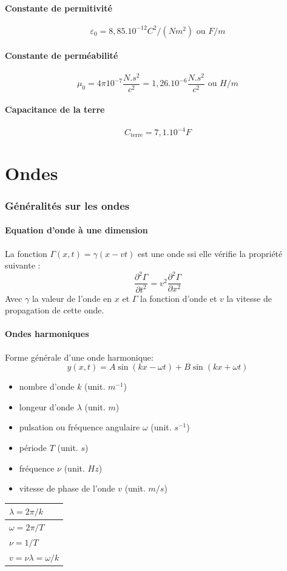 \documentclass[a4paper,10pt,openright,titlepage]{report}
\newcommand{\Hz}{\textit{Hz}}
\begin{document}
\subsection{Constante de permitivité}
$$\varepsilon_0 = 8,85.10^{-12} C^2/(Nm^2) \mbox{ ou } F/m$$

\subsection{Constante de perméabilité}
$$\mu_0 = 4 \pi 10^{-7} \frac{N.s^2}{c^2} = 1,26.10^{-6} \frac{N.s^2}{c^2} \mbox{ ou }H/m$$

\subsection{Capacitance de la terre}
$$C_{\mbox{terre}} = 7,1.10^{-4} F$$

\part{Ondes}

\section{Généralités sur les ondes}
\subsection{Equation d'onde à une dimension}
La fonction $\Gamma(x,t) = \gamma(x - v t) $ est une onde ssi elle vérifie la propriété suivante :
$$\frac{\partial^2 \Gamma}{\partial t^2} = v^2 \frac{\partial^2 \Gamma}{\partial x^2}$$
Avec $\gamma$ la valeur de l'onde en $x$ et $\Gamma$ la fonction d'onde et $v$ la vitesse de propagation de cette onde.
\subsection{Ondes harmoniques}
Forme générale d'une onde harmonique:
$$y(x,t) = A \sin (k x - \omega t) + B \sin (k x + \omega t)$$

\begin{itemize}
 \item{nombre d'onde $k$ (unit. $m^{-1}$)}
 \item{longeur d'onde $\lambda$ (unit. $m$)}
 \item{pulsation ou fréquence angulaire $\omega$ (unit. $s^{-1}$)}
 \item{période $T$ (unit. $s$)}
 \item{fréquence $\nu$ (unit. $\Hz$)}
 \item{vitesse de phase de l'onde $v$ (unit. $m/s$)}
\end{itemize}
\begin{center}
\begin{tabular}{|l|}\hline
$\lambda = 2\pi/k$\\ \hline
$\omega = 2\pi/T$ \\ \hline
$\nu = 1/T$ \\ \hline
$v = \nu \lambda =\omega/k$ \\ \hline
\end{tabular}
\end{center}
\end{document}

